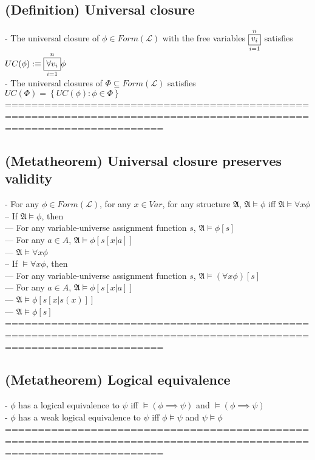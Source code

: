 \documentclass{book}
\newcommand{\is}{:\equiv}
\newcommand{\set}[1]{\left\{ #1 \right\}}
\newcommand{\vdc}[3]{\underset{#2}{\overset{#3}{\fbox{$#1$}}}}
\begin{document}
\subsection{(Definition) Universal closure} %
	- The universal closure of $\phi \in Form(\mathcal{L})$ with the free variables $\vdc{v_i}{i=1}{n}$ satisfies $UC(\phi) \is \vdc{\forall v_i}{i=1}{n} \phi$ \\
	- The universal closures of $\Phi \subseteq Form(\mathcal{L})$ satisfies $UC(\Phi) = \set{UC(\phi): \phi \in \Phi}$ \\ 
	====================================================================================================================
\subsection{(Metatheorem) Universal closure preserves validity} %
	- For any $\phi \in Form(\mathcal{L})$, for any $x \in Var$, for any structure $\mathfrak{A}$, $\mathfrak{A} \vDash \phi$ iff $\mathfrak{A} \vDash \forall x \phi$ \\
		-- If $\mathfrak{A} \vDash \phi$, then \\
			--- For any variable-universe assignment function $s$, $\mathfrak{A} \vDash \phi[s]$ \\
			--- For any $a \in A$, $\mathfrak{A} \vDash \phi[s[x|a]]$ \\
			--- $\mathfrak{A} \vDash \forall x \phi$ \\
		-- If $\vDash \forall x \phi$, then \\
			--- For any variable-universe assignment function $s$, $\mathfrak{A} \vDash (\forall x \phi)[s]$ \\
			--- For any $a \in A$, $\mathfrak{A} \vDash \phi[s[x|a]]$ \\
			--- $\mathfrak{A} \vDash \phi[s[x|s(x)]]$ \\
			--- $\mathfrak{A} \vDash \phi[s]$ \\
	====================================================================================================================
\subsection{(Metatheorem) Logical equivalence} %
	- $\phi$ has a logical equivalence to $\psi$ iff $\vDash (\phi \implies \psi)$ and $\vDash (\phi \implies \psi)$ \\
	- $\phi$ has a weak logical equivalence to $\psi$ iff $\phi \vDash \psi$ and $\psi \vDash \phi$ \\
	====================================================================================================================
\end{document}
